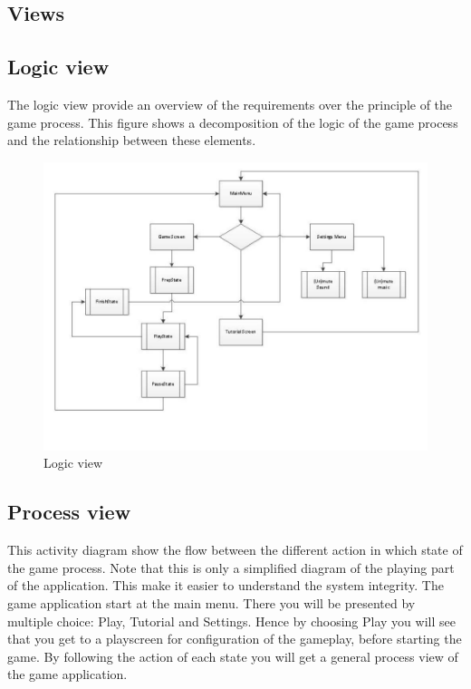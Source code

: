 \subsection{Views}	

\subsection{Logic view} 
The logic view provide an overview of the requirements over the principle of the game process. This figure shows a decomposition of the logic of the game process and the relationship between these elements.

\begin{figure}[ht!]
	\centering
	\includegraphics[width=150mm]{viewpoint.jpg}
	\caption{Logic view}
	\label{fig:logicView}
\end{figure}

\newpage
\subsection{Process view}
This activity diagram show the flow between the different action in which state of the game process. Note that this is only a simplified diagram of the playing part of the application. This make it easier to understand the system integrity. The game application start at the main menu. There you will be presented by multiple choice: Play, Tutorial and Settings. Hence by choosing Play you will see that you get to a playscreen for configuration of the gameplay, before starting the game. By following the action of each state you will get a general process view of the game application.


